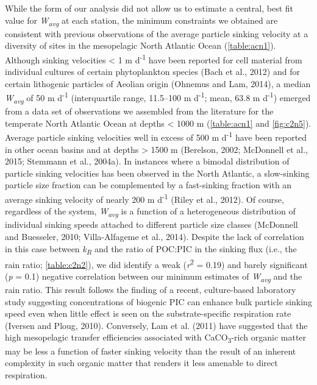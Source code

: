 While the form of our analysis did not allow us to estimate a central, best fit value for \emph{W\textsubscript{avg}} at each station, the minimum constraints we obtained are consistent with previous observations of the average particle sinking velocity at a diversity of sites in the mesopelagic North Atlantic Ocean (\autoref{table:acn1}). Although sinking velocities \textless{} 1 m d\textsuperscript{-1} have been reported for cell material from individual cultures of certain phytoplankton species (Bach et al., 2012) and for certain lithogenic particles of Aeolian origin (Ohnemus and Lam, 2014), a median \emph{W\textsubscript{avg}} of 50 m d\textsuperscript{-1} (interquartile range, 11.5--100 m d\textsuperscript{-1}; mean, 63.8 m d\textsuperscript{-1}) emerged from a data set of observations we assembled from the literature for the temperate North Atlantic Ocean at depths \textless{} 1000 m (\autoref{table:acn1} and \autoref{fig:c2n5}). Average particle sinking velocities well in excess of 500 m d\textsuperscript{-1} have been reported in other ocean basins and at depths \textgreater{} 1500 m (Berelson, 2002; McDonnell et al., 2015; Stemmann et al., 2004a). In instances where a bimodal distribution of particle sinking velocities has been observed in the North Atlantic, a slow-sinking particle size fraction can be complemented by a fast-sinking fraction with an average sinking velocity of nearly 200 m d\textsuperscript{-1} (Riley et al., 2012). Of course, regardless of the system, \emph{W\textsubscript{avg}} is a function of a heterogeneous distribution of individual sinking speeds attached to different particle size classes (McDonnell and Buesseler, 2010; Villa-Alfageme et al., 2014). Despite the lack of correlation in this case between \emph{k\textsubscript{R}} and the ratio of POC:PIC in the sinking flux (i.e., the rain ratio; \autoref{table:c2n2}), we did identify a weak (\emph{r}\textsuperscript{2} = 0.19) and barely significant (\emph{p} = 0.1) negative correlation between our minimum estimates of \emph{W\textsubscript{avg}} and the rain ratio. This result follows the finding of a recent, culture-based laboratory study suggesting concentrations of biogenic PIC can enhance bulk particle sinking speed even when little effect is seen on the substrate-specific respiration rate (Iversen and Ploug, 2010). Conversely, Lam et al. (2011) have suggested that the high mesopelagic transfer efficiencies associated with CaCO\textsubscript{3}-rich organic matter may be less a function of faster sinking velocity than the result of an inherent complexity in such organic matter that renders it less amenable to direct respiration.

